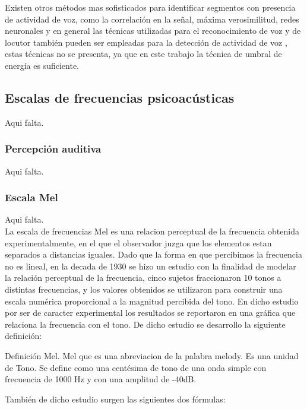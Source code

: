 Existen otros m\'etodos mas sofisticados para identificar segmentos con presencia de actividad de voz, como la correlaci\'on en la señal, m\'axima verosimilitud, redes neuronales y en general las t\'ecnicas utilizadas para el reconocimiento de voz y de locutor tambi\'en pueden ser empleadas para la detecci\'on de actividad de voz \cite{beigi2011}, estas t\'ecnicas no se presenta, ya que en este trabajo la t\'ecnica de umbral de energ\'ia es suficiente.\\

\subsection{Escalas de frecuencias psicoac\'usticas}

Aqui falta.\\

\subsubsection{Percepci\'on auditiva}

Aqui falta.\\

\subsubsection{Escala Mel}

Aqui falta.\\

La escala de frecuencias Mel es una relacion perceptual de la frecuencia obtenida experimentalmente, en el que el observador juzga que los elementos estan separados a distancias iguales. Dado que la forma en que percibimos la frecuencia no es lineal, en la decada de 1930 se hizo un estudio con la finalidad de modelar la relación perceptual de la frecuencia, cinco sujetos fraccionaron 10 tonos a distintas frecuencias, y los valores obtenidos se utilizaron para construir una escala num\'erica proporcional a la magnitud percibida del tono. En dicho estudio por ser de caracter experimental los resultados se reportaron en una gr\'afica que relaciona la frecuencia con el tono. De dicho estudio se desarrollo la siguiente definición: 

Definición Mel. Mel que es una abreviacion de la palabra melody. Es una unidad de Tono. Se define como una cent\'esima de tono de una onda simple con frecuencia de 1000 Hz y con una amplitud de -40dB.

También de dicho estudio surgen las siguientes dos fórmulas: 

